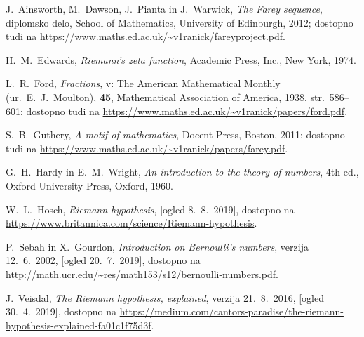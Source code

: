 \documentclass[mat1]{fmfdelo}
\begin{document}
\begin{thebibliography}{99}

 J.~Ainsworth, M.~Dawson, J.~Pianta in J.~Warwick, \emph{The Farey sequence}, diplomsko delo, School of Mathematics, University of Edinburgh, 2012; dostopno tudi na \url{https://www.maths.ed.ac.uk/~v1ranick/fareyproject.pdf}.

 H.~M.~Edwards, \emph{Riemann's zeta function}, Academic Press, Inc., New York, 1974.

 L.~R.~Ford, \emph{Fractions}, v: The American Mathematical Monthly (ur.\ E.~J.~Moulton), \textbf{45}, Mathematical Association of America, 1938, str.\ 586--601; dostopno tudi na \url{https://www.maths.ed.ac.uk/~v1ranick/papers/ford.pdf}.

 S.~B.~Guthery, \emph{A motif of mathematics}, Docent Press, Boston, 2011; dostopno tudi na \url{https://www.maths.ed.ac.uk/~v1ranick/papers/farey.pdf}.

 G.~H.~Hardy in E.~M.~Wright, \emph{An introduction to the theory of numbers}, 4th ed., Oxford University Press, Oxford, 1960.

 W.~L.~Hosch, \emph{Riemann hypothesis}, [ogled 8.~8.~2019], dostopno na \url{https://www.britannica.com/science/Riemann-hypothesis}.

 P.~Sebah in X.~Gourdon, \emph{Introduction on Bernoulli's numbers}, verzija 12.~6.~2002, [ogled 20.~7.~2019], dostopno na \url{http://math.ucr.edu/~res/math153/s12/bernoulli-numbers.pdf}.

 J.~Veisdal, \emph{The Riemann hypothesis, explained}, verzija 21.~8.~2016, [ogled 30.~4.~2019], dostopno na \url{https://medium.com/cantors-paradise/the-riemann-hypothesis-explained-fa01c1f75d3f}.

\end{thebibliography}
\end{document}
